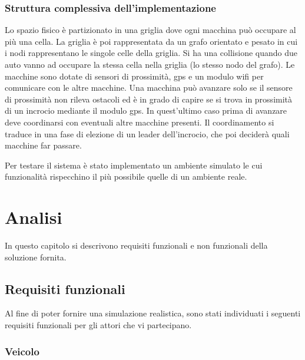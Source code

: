 \documentclass{memoir}
\begin{document}
\subsection{Struttura complessiva dell'implementazione}

Lo spazio fisico è partizionato in una griglia dove ogni macchina può occupare
al più una cella. La griglia è poi rappresentata da un grafo orientato e pesato
in cui i nodi rappresentano le singole celle della griglia. Si ha una collisione
quando due auto vanno ad occupare la stessa cella nella griglia (lo stesso nodo
del grafo). Le macchine sono dotate di sensori di prossimità, gps e un modulo
wifi per comunicare con le altre macchine. Una macchina può avanzare solo se il
sensore di prossimità non rileva ostacoli ed è in grado di capire se si trova in
prossimità di un incrocio mediante il modulo gps. In quest'ultimo caso prima di
avanzare deve coordinarsi con eventuali altre macchine presenti. Il
coordinamento si traduce in una fase di elezione di un leader dell'incrocio, che
poi deciderà quali macchine far passare.


Per testare il sistema è stato implementato un ambiente simulato le cui
funzionalità rispecchino il più possibile quelle di un ambiente reale.

\chapter{Analisi}\label{ch:analysis}
In questo capitolo si descrivono requisiti funzionali e non funzionali della
soluzione fornita.

\section{Requisiti funzionali}

Al fine di poter fornire una simulazione realistica, sono stati individuati i
seguenti requisiti funzionali per gli attori che vi partecipano.

\subsection{Veicolo}
\end{document}

